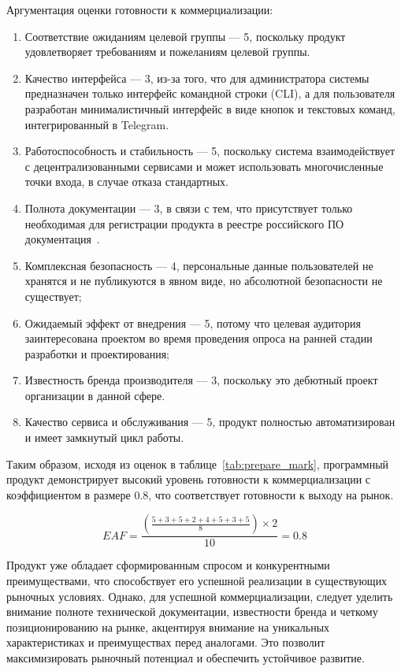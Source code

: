 Аргументация оценки готовности к коммерциализации:
\begin{enumerate}
    \item Соответствие ожиданиям целевой группы --- 5, поскольку продукт удовлетворяет требованиям и пожеланиям целевой группы.
    \item Качество интерфейса --- 3, из-за того, что для администратора системы предназначен только интерфейс командной строки (CLI), а для пользователя разработан минималистичный интерфейс в виде кнопок и текстовых команд, интегрированный в Telegram.
    \item Работоспособность и стабильность --- 5, поскольку система взаимодействует с децентрализованными сервисами и может использовать многочисленные точки входа, в случае отказа стандартных.
    \item Полнота документации --- 3, в связи с тем, что присутствует только необходимая для регистрации продукта в реестре российского ПО документация~\cite{bib:reestrpo_docs}.
    \item Комплексная безопасность --- 4, персональные данные пользователей не хранятся и не публикуются в явном виде, но абсолютной безопасности не существует;
    \item Ожидаемый эффект от внедрения --- 5, потому что целевая аудитория заинтересована проектом во время проведения опроса на ранней стадии разработки и проектирования;
    \item Известность бренда производителя --- 3, поскольку это дебютный проект организации в данной сфере.
    \item Качество сервиса и обслуживания --- 5, продукт полностью автоматизирован и имеет замкнутый цикл работы.
\end{enumerate}

Таким образом, исходя из оценок в таблице~\ref{tab:prepare_mark}, программный продукт демонстрирует высокий уровень готовности к коммерциализации с коэффициентом в размере 0.8, что соответствует готовности к выходу на рынок.

$$EAF = \frac{\left(\frac{5 + 3 + 5 + 2 + 4 + 5 + 3 + 5}{8}\right) \times 2}{10} = 0.8$$

Продукт уже обладает сформированным спросом и конкурентными преимуществами, что способствует его успешной реализации в существующих рыночных условиях. Однако, для успешной коммерциализации, следует уделить внимание полноте технической документации, известности бренда и четкому позиционированию на рынке, акцентируя внимание на уникальных характеристиках и преимуществах перед аналогами. Это позволит максимизировать рыночный потенциал и обеспечить устойчивое развитие.

